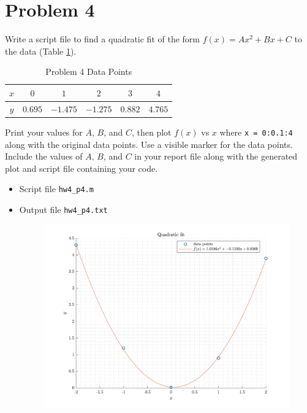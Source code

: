 \section{Problem 4}%
\label{sec:problem_4}
Write a script file to find a quadratic fit of the form $f(x) = A x^{2} + B x + C$ to the data (Table \ref{tab:p4}).
\begin{table}[!hbtp]
  \centering
  \caption{Problem 4 Data Points}
  \label{tab:p4}
  \begin{tabular}{cccccc}
    \toprule
    $x$ & $0$     & $1$      & $2$      & $3$     & $4$ \\
    \midrule
    $y$ & $0.695$ & $-1.475$ & $-1.275$ & $0.882$ & $4.765$ \\
    \bottomrule
  \end{tabular}
\end{table}
Print your values for $A$, $B$, and $C$, then plot $f(x)$ vs $x$ where \verb|x = 0:0.1:4| along with the original data  points. Use a visible marker for the data points. Include the values of $A$, $B$, and $C$ in your report file along with the generated plot and script file containing your code.
\begin{solution}
  \quad
  \begin{itemize}
    \item
      Script file \verb|hw4_p4.m|
      
    \item
      Output file \verb|hw4_p4.txt|
      
      \begin{figure}[!hbtp]
        \centering
        \includegraphics[width=0.8\linewidth]{../src/hw4_p4.pdf}
        \caption{}%
        \label{fig:}
      \end{figure}
  \end{itemize}
\end{solution}
